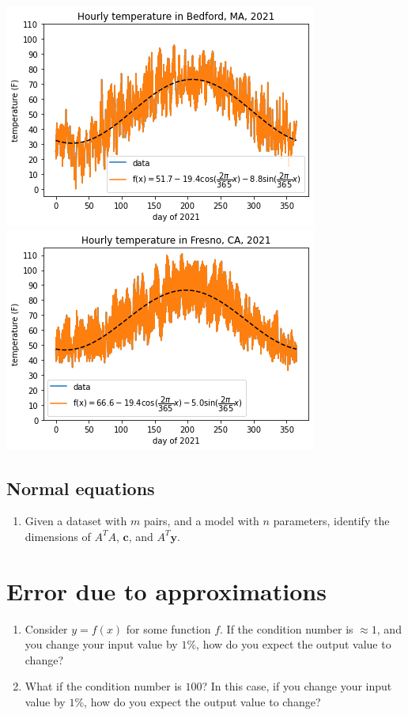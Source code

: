 \documentclass[12pt,letterpaper,noanswers]{exam}
\begin{document}
\includegraphics[width=0.45\linewidth]{img/C03weatherBedfordfit.png}
\includegraphics[width=0.45\linewidth]{img/C03weatherFresnofit.png}

\subsection{Normal equations}
\begin{enumerate}[resume]
    \item Given a dataset with $m$ pairs, and a model with $n$ parameters, identify the dimensions of $A^TA$, $\mathbf{c}$, and $A^T\mathbf{y}$.    
\end{enumerate}
\vspace{1in}
\section{Error due to approximations}

\begin{enumerate}[resume]
\itemsep50pt
\item
Consider $y = f(x)$ for some function $f$.  If the condition number is $\approx 1$, and you change your input value by $1\%$, how do you expect the output value to change?

\vspace{0.5in}

\item
What if the condition number is $100$?  In this case, if you change your input value by $1\%$, how do you expect the output value to change?

\vspace{0.5in}
\end{enumerate}
\end{document}
